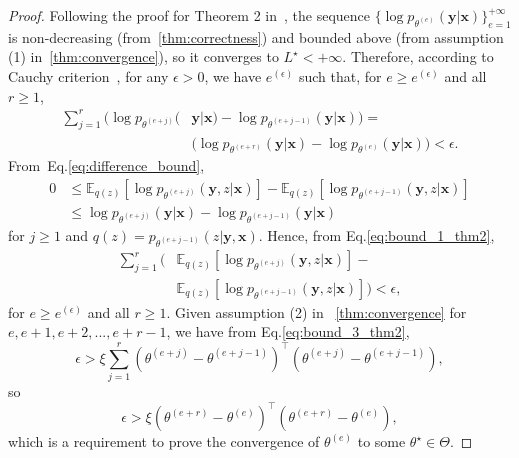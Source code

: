 \documentclass[review]{elsarticle}
\theoremstyle{plain}
\begin{document}
\begin{proof}
Following the proof for Theorem 2 in~\citep{dempster1977maximum}, the sequence $\{ \log p_{\theta^{(e)}}(\mathbf{y}|\mathbf{x})\}_{e=1}^{+\infty}$ is non-decreasing (from~\autoref{thm:correctness}) and bounded  above (from assumption (1) in~\autoref{thm:convergence}), so it converges to $L^{\star} < +\infty$. 
Therefore, according to Cauchy criterion~\citep{nguyen2020tutorial}, for any $\epsilon > 0$, we have $e^{(\epsilon)}$ such that, for $e \ge e^{(\epsilon)}$ and all $r \ge 1$,
\begin{equation}
\begin{split}
    \sum_{j=1}^{r} \big( \log p_{\theta^{(e+j)}}( & \mathbf{y}|\mathbf{x})  - 
    \log p_{\theta^{(e+j-1)}}(\mathbf{y}|\mathbf{x}) 
    \big) = \\
    & \big( \log p_{\theta^{(e+r)}}(\mathbf{y}|\mathbf{x}) - \log p_{\theta^{(e)}}(\mathbf{y}|\mathbf{x}) \big) < \epsilon.
\end{split}    
    \label{eq:bound_1_thm2}
\end{equation}
From~Eq.\ref{eq:difference_bound},
\begin{equation}
\begin{split}
    0 & \le  
    \mathbb{E}_{q(z)}[\log p_{\theta^{(e+j)}}(\mathbf{y},z|\mathbf{x})] - 
    \mathbb{E}_{q(z)}[\log p_{\theta^{(e+j-1)}}(\mathbf{y},z|\mathbf{x})] \\
    &\le
    \log p_{\theta^{(e+j)}}(\mathbf{y}|\mathbf{x}) - \log p_{\theta^{(e+j-1)}}(\mathbf{y}|\mathbf{x})
\end{split}    
    \label{eq:bound_2_thm2}
\end{equation}
for $j \ge 1$ and $q(z)=p_{\theta^{(e+j-1)}}(z|\mathbf{y},\mathbf{x})$. Hence, from Eq.\ref{eq:bound_1_thm2},
\begin{equation}
\begin{split}
    \sum_{j=1}^r \big( & \mathbb{E}_{q(z)}[\log p_{\theta^{(e+j)}}(\mathbf{y},z|\mathbf{x})] - \\
    & \mathbb{E}_{q(z)}[\log p_{\theta^{(e+j-1)}}(\mathbf{y},z|\mathbf{x})] \big) < \epsilon,
\end{split}    
    \label{eq:bound_3_thm2}
\end{equation}
for $e \ge e^{(\epsilon)}$ and all $r \ge 1$.
Given assumption (2) in ~\autoref{thm:convergence} for $e,e+1,e+2,...,e+r-1$, we
 have from Eq.\ref{eq:bound_3_thm2},
 \begin{equation}
     \epsilon > \xi \sum_{j=1}^{r} \left( \theta^{(e+j)} - \theta^{(e+j-1)} \right)^{\top}\left( \theta^{(e+j)} - \theta^{(e+j-1)} \right),
 \end{equation}
so
\begin{equation}
     \epsilon > \xi \left( \theta^{(e+r)} - \theta^{(e)} \right)^{\top}\left( \theta^{(e+r)} - \theta^{(e)} \right),
 \end{equation}
 which is a requirement to prove the convergence of $\theta^{(e)}$ to some $\theta^{\star} \in \Theta$.
\end{proof}
\end{document}
